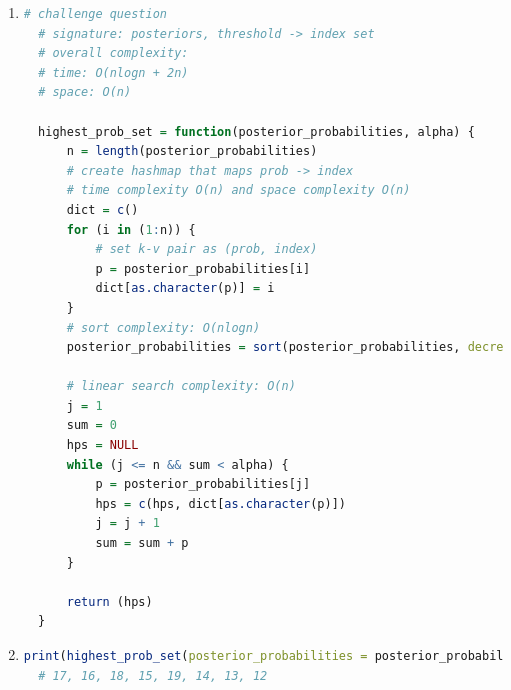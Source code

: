 \documentclass{article}
\begin{document}
\begin{enumerate}

\item
\begin{lstlisting}[language=R]
  # challenge question
  # signature: posteriors, threshold -> index set
  # overall complexity:
  # time: O(nlogn + 2n)
  # space: O(n)
  
  highest_prob_set = function(posterior_probabilities, alpha) {
      n = length(posterior_probabilities)
      # create hashmap that maps prob -> index
      # time complexity O(n) and space complexity O(n)
      dict = c()
      for (i in (1:n)) {
          # set k-v pair as (prob, index)
          p = posterior_probabilities[i]
          dict[as.character(p)] = i
      }
      # sort complexity: O(nlogn)
      posterior_probabilities = sort(posterior_probabilities, decreasing = TRUE)
  
      # linear search complexity: O(n)
      j = 1
      sum = 0
      hps = NULL
      while (j <= n && sum < alpha) {
          p = posterior_probabilities[j]
          hps = c(hps, dict[as.character(p)])
          j = j + 1
          sum = sum + p
      }
  
      return (hps)
  }
\end{lstlisting}


\item 
\begin{lstlisting}[language=R]
  print(highest_prob_set(posterior_probabilities = posterior_probabilities, alpha=0.75))
  # 17, 16, 18, 15, 19, 14, 13, 12
\end{lstlisting}

\end{enumerate}







 
\end{document}
